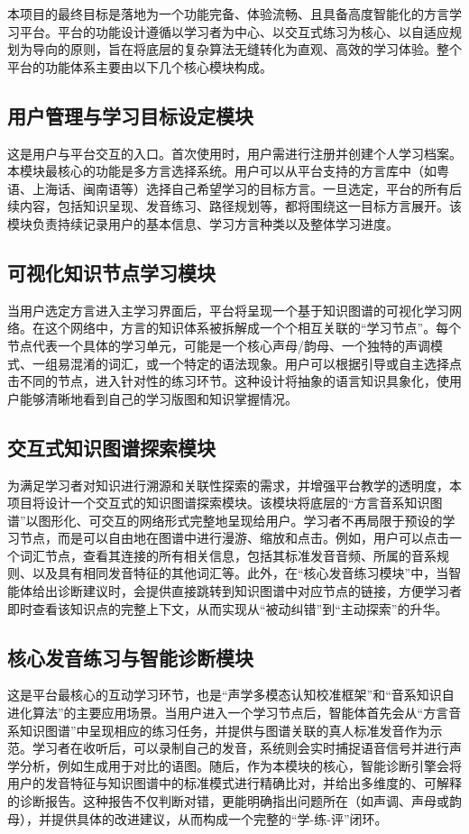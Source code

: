 本项目的最终目标是落地为一个功能完备、体验流畅、且具备高度智能化的方言学习平台。平台的功能设计遵循以学习者为中心、以交互式练习为核心、以自适应规划为导向的原则，旨在将底层的复杂算法无缝转化为直观、高效的学习体验。整个平台的功能体系主要由以下几个核心模块构成。

\subsection{用户管理与学习目标设定模块}
这是用户与平台交互的入口。首次使用时，用户需进行注册并创建个人学习档案。本模块最核心的功能是多方言选择系统。用户可以从平台支持的方言库中（如粤语、上海话、闽南语等）选择自己希望学习的目标方言。一旦选定，平台的所有后续内容，包括知识呈现、发音练习、路径规划等，都将围绕这一目标方言展开。该模块负责持续记录用户的基本信息、学习方言种类以及整体学习进度。

\subsection{可视化知识节点学习模块}
当用户选定方言进入主学习界面后，平台将呈现一个基于知识图谱的可视化学习网络。在这个网络中，方言的知识体系被拆解成一个个相互关联的“学习节点”。每个节点代表一个具体的学习单元，可能是一个核心声母/韵母、一个独特的声调模式、一组易混淆的词汇，或一个特定的语法现象。用户可以根据引导或自主选择点击不同的节点，进入针对性的练习环节。这种设计将抽象的语言知识具象化，使用户能够清晰地看到自己的学习版图和知识掌握情况。

\subsection{交互式知识图谱探索模块}
为满足学习者对知识进行溯源和关联性探索的需求，并增强平台教学的透明度，本项目将设计一个交互式的知识图谱探索模块。该模块将底层的“方言音系知识图谱”以图形化、可交互的网络形式完整地呈现给用户。学习者不再局限于预设的学习节点，而是可以自由地在图谱中进行漫游、缩放和点击。例如，用户可以点击一个词汇节点，查看其连接的所有相关信息，包括其标准发音音频、所属的音系规则、以及具有相同发音特征的其他词汇等。此外，在“核心发音练习模块”中，当智能体给出诊断建议时，会提供直接跳转到知识图谱中对应节点的链接，方便学习者即时查看该知识点的完整上下文，从而实现从“被动纠错”到“主动探索”的升华。

\subsection{核心发音练习与智能诊断模块}
这是平台最核心的互动学习环节，也是“声学多模态认知校准框架”和“音系知识自进化算法”的主要应用场景。当用户进入一个学习节点后，智能体首先会从“方言音系知识图谱”中呈现相应的练习任务，并提供与图谱关联的真人标准发音作为示范。学习者在收听后，可以录制自己的发音，系统则会实时捕捉语音信号并进行声学分析，例如生成用于对比的语图。随后，作为本模块的核心，智能诊断引擎会将用户的发音特征与知识图谱中的标准模式进行精确比对，并给出多维度的、可解释的诊断报告。这种报告不仅判断对错，更能明确指出问题所在（如声调、声母或韵母），并提供具体的改进建议，从而构成一个完整的“学-练-评”闭环。

